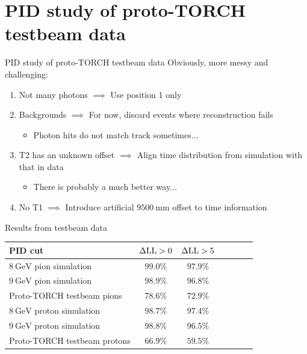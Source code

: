 \documentclass{beamer}
\begin{document}
\section{PID study of proto-TORCH testbeam data}
\begin{frame}{PID study of proto-TORCH testbeam data}
  Obviously, more messy and challenging:
  \begin{enumerate}
    \setlength\itemsep{1.0em}
    \item{Not many photons $\implies$ Use position 1 only}
    \item{Backgrounds $\implies$ For now, discard events where reconstruction fails}
    \begin{itemize}
      \item{Photon hits do not match track sometimes...}
    \end{itemize}
    \item{T2 has an unknown offset $\implies$ Align time distribution from simulation with that in data}
    \begin{itemize}
      \item{There is probably a much better way...}
    \end{itemize}
    \item{No T1 $\implies$ Introduce artificial $\SI{9500}{\milli\meter}$ offset to time information}
  \end{enumerate}
\end{frame}

\begin{frame}{Results from testbeam data}
  \begin{center}
    \begin{tabular}{lcccccc} 
      \hline
      PID cut                              & $\Delta{\rm LL} > 0$ & $\Delta{\rm LL} > 5$ \\
      \hline
      $\SI{8}{\giga\eV}$ pion simulation   & $99.0\%$             & $97.9\%$ \\
      $\SI{9}{\giga\eV}$ pion simulation   & $98.9\%$             & $96.8\%$ \\
      Proto-TORCH testbeam pions           & $78.6\%$             & $72.9\%$ \\
      \hline
      $\SI{8}{\giga\eV}$ proton simulation & $98.7\%$             & $97.4\%$ \\
      $\SI{9}{\giga\eV}$ proton simulation & $98.8\%$             & $96.5\%$ \\
      Proto-TORCH testbeam protons         & $66.9\%$             & $59.5\%$ \\
      \hline
    \end{tabular}
  \end{center}
\end{frame}
\end{document}
